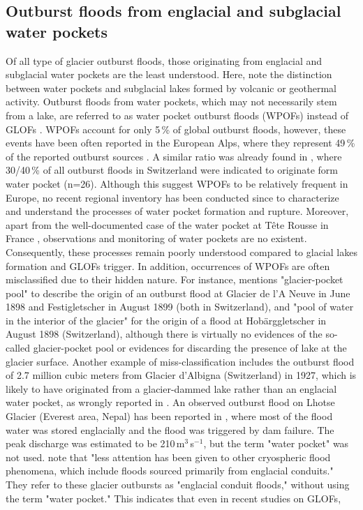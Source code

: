 

\subsection{Outburst floods from englacial and subglacial water pockets} 
\label{subsection:glofs_water_pockets}

Of all type of glacier outburst floods, those originating from englacial and subglacial water pockets are the least understood. Here, note the distinction between water pockets and subglacial lakes formed by volcanic or geothermal activity. Outburst floods from water pockets, which may not necessarily stem from a lake, are referred to as water pocket outburst floods (WPOFs) instead of GLOFs \citep[as in][]{Deline&al2004}. WPOFs account for only 5\,\% of global outburst floods, however, these events have been often reported in the European Alps, where they represent 49\,\% of the reported outburst sources \citep{Lutzow&al2023}. A similar ratio was already found in \cite{Haeberli1983}, where 30/40\,\% of all outburst floods in Switzerland were indicated to originate form water pocket (n=26). Although this suggest WPOFs to be relatively frequent in Europe, no recent regional inventory has been conducted since \cite{Haeberli1983} to characterize and understand the processes of water pocket formation and rupture. Moreover, apart from the well-documented case of the water pocket at Tête Rousse in France \citep{Vincent&al2010b,Vincent&al2012}, observations and monitoring of water pockets are no existent. Consequently, these processes remain poorly understood compared to glacial lakes formation and GLOFs trigger. In addition, occurrences of WPOFs are often misclassified due to their hidden nature. For instance, \cite{Rabot1905} mentions "glacier-pocket pool" to describe the origin of an outburst flood at Glacier de l'A Neuve in June 1898 and Festigletscher in August 1899 (both in Switzerland), and "pool of water in the interior of the glacier" for the origin of a flood at Hobärggletscher in August 1898 (Switzerland), although there is virtually no evidences of the so-called glacier-pocket pool or evidences for discarding the presence of lake at the glacier surface. Another example of miss-classification includes the outburst flood of 2.7 million cubic meters from Glacier d'Albigna (Switzerland) in 1927, which is likely to have originated from a glacier-dammed lake rather than an englacial water pocket, as wrongly reported in \cite{Lutzow&al2023}. An observed outburst flood on Lhotse Glacier (Everest area, Nepal) has been reported in \cite{Rounce&al2017}, where most of the flood water was stored englacially and the flood was triggered by dam failure. The peak discharge was estimated to be 210\,m$^3$\,s$^{-1}$, but the term "water pocket" was not used. \cite{Byers&al2022} note that "less attention has been given to other cryospheric flood phenomena, which include floods sourced primarily from englacial conduits." They refer to these glacier outbursts as "englacial conduit floods," without using the term "water pocket." This indicates that even in recent studies on GLOFs, 